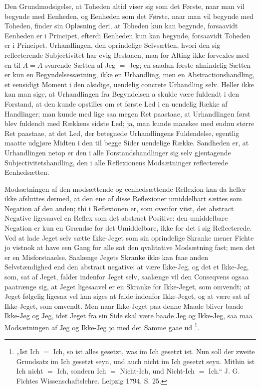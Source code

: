 \documentclass[11pt]{book}
\newcommand{\opage}[1]{\marginnote{\footnotesize\textit{[#1]}}}
\begin{document}
Den Grundmodsigelse, at Toheden altid viser sig som det Første, naar man
vil begynde med Eenheden, og Eenheden som det Første, naar man vil begynde
med Toheden, finder sin Opløsning deri, at Toheden kun kan begynde,
forsaavidt Eenheden er i Principet, efterdi Eenheden kun kan begynde,
forsaavidt Toheden er i Principet. Urhandlingen, den oprindelige
Selvsætten, hvori den sig reflecterende Subjectivitet har evig Bestaaen,
maa for Alting ikke forvexles med en til $A = A$ svarende Sætten af Jeg $=$
Jeg; en saadan første almindelig Sætten er kun en Begyndelsessætning, ikke
en Urhandling, men en Abstractionshandling, et eensidigt Moment i den
alsidige, uendelig concrete Urhandling selv. Heller ikke kan man sige, at
Urhandlingen fra Begyndelsen a skulde være fuldendt i den Forstand, at den
kunde opstilles om et første Led i en uendelig Række af Handlinger; man
kunde med lige saa megen Ret paastaae, at Urhandlingen først blev fuldendt
med Rækkens sidste Led; ja, man kunde maaskee med endnu større Ret
paastaae, at det Led, der betegnede Urhandlingens Fuldendelse, egentlig
maatte udgjøre Midten i den til
\opage{68} \setcounter{footnote}{0}%
begge Sider uendelige Række. Sandheden er, at Urhandlingen netop er den i alle Forstandshandlinger sig selv gjentagende Subjectivitetshandling, den i alle Reflexionens Modsætninger reflecterede Eenhedsætten.

Modsætningen af den modsættende og eenhedsættende Reflexion kan da heller ikke afsluttes dermed, at den ene af disse Reflexioner umiddelbart sættes som Negation af den anden; thi i Reflexionen er, som ovenfor viist, det abstract Negative ligesaavel en Reflex som det abstract Positive: den umiddelbare Negation er kun en Grændse for det Umiddelbare, ikke for det i sig Reflecterede. Ved at lade Jeget selv sætte Ikke-Jeget som sin oprindelige Skranke mener Fichte jo vistnok at have een Gang for alle sat den qvalitative Modsætning fast; men det er en Misforstaaelse. Saalænge Jegets Skranke ikke kan faae anden Selvstændighed end den abstract negative: at være Ikke-Jeg, og det et Ikke-Jeg, som, sat af Jeget, falder indenfor Jeget selv, saalænge vil den Conseqvens ogsaa paatrænge sig, at Jeget ligesaavel er en Skranke for Ikke-Jeget, som omvendt; at Jeget følgelig ligesaa vel kan siges at falde indenfor Ikke-Jeget, og at være sat af Ikke-Jeget, som omvendt. Men naar Ikke-Jeget paa denne Maade bliver baade Ikke-Jeg og Jeg, idet Jeget fra sin Side skal være baade Jeg og Ikke-Jeg, saa maa Modsætningen af Jeg og Ikke-Jeg jo med det Samme gaae ud%
\footnote{„Ist Ich $=$ Ich, so ist alles gesetzt, was im Ich gesetzt ist. Nun soll der zweite Grundsatz im Ich gesetzt seyn, und auch nicht im Ich gesetzt seyn. Mithin ist Ich nicht $=$ Ich, sondern Ich $=$ Nicht-Ich, und Nicht-Ich $=$ Ich.“ J. G. Fichtes Wissenschaftslehre. Leipzig 1794, S. 25.}.
\end{document}
